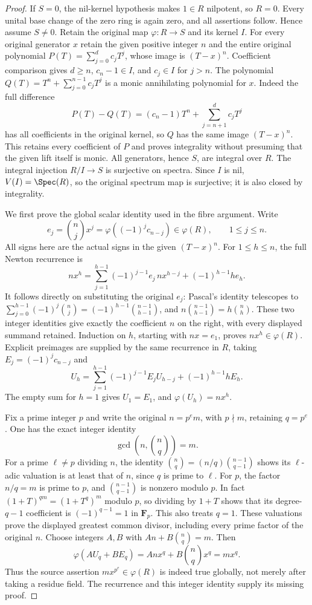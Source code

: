 \begin{proof}
If $S=0$, the nil-kernel hypothesis
makes $1\in R$ nilpotent, so $R=0$.
Every unital base change of the zero
ring is again zero, and all assertions
follow. Hence assume $S\neq0$.
Retain the original map $\varphi:R\to S$
and its kernel $I$. For every original
generator $x$ retain the given positive
integer $n$ and the entire original
polynomial $P(T)=\sum_{j=0}^d c_jT^j$,
whose image is $(T-x)^n$. Coefficient
comparison gives $d\geq n$,
$c_n-1\in I$, and $c_j\in I$ for
$j>n$. The polynomial
$Q(T)=T^n+\sum_{j=0}^{n-1}c_jT^j$
is a monic annihilating polynomial
for $x$. Indeed the full difference
$$
P(T)-Q(T)=(c_n-1)T^n+
\sum_{j=n+1}^d c_jT^j
$$
has all coefficients in the original
kernel, so $Q$ has the same image
$(T-x)^n$. This retains every
coefficient of $P$ and proves
integrality without presuming that
the given lift itself is monic.
All generators, hence $S$, are
integral over $R$. The integral
injection $R/I\to S$ is surjective
on spectra. Since $I$ is nil,
$V(I)=\Spec(R)$, so the original
spectrum map is surjective; it is
also closed by integrality.

We first prove the global scalar
identity used in the fibre argument.
Write
$$
e_j=\binom nj x^j
=\varphi((-1)^j c_{n-j})\in\varphi(R),
\qquad 1\leq j\leq n.
$$
All signs here are the actual signs
in the given $(T-x)^n$. For
$1\leq h\leq n$, the full Newton
recurrence is
$$
n x^h=
\sum_{j=1}^{h-1}(-1)^{j-1}e_j\,n x^{h-j}
+(-1)^{h-1}h e_h.
$$
It follows directly on substituting
the original $e_j$: Pascal's identity
telescopes to
$\sum_{j=0}^{h-1}(-1)^j\binom nj
=(-1)^{h-1}\binom{n-1}{h-1}$,
and $n\binom{n-1}{h-1}=h\binom nh$.
These two integer identities give
exactly the coefficient $n$ on the
right, with every displayed summand
retained. Induction on $h$, starting
with $n x=e_1$, proves $n x^h\in\varphi(R)$.
Explicit preimages are supplied by
the same recurrence in $R$, taking
$E_j=(-1)^j c_{n-j}$ and
$$
U_h=\sum_{j=1}^{h-1}(-1)^{j-1}E_j U_{h-j}
+(-1)^{h-1}h E_h.
$$
The empty sum for $h=1$ gives
$U_1=E_1$, and $\varphi(U_h)=n x^h$.

Fix a prime integer $p$ and write
the original $n=p^e m$, with
$p\nmid m$, retaining $q=p^e$.
One has the exact integer identity
$$
\gcd\left(n,\binom nq\right)=m.
$$
For a prime $\ell\neq p$ dividing
$n$, the identity
$\binom nq=(n/q)\binom{n-1}{q-1}$
shows its $\ell$-adic valuation is
at least that of $n$, since
$q$ is prime to $\ell$.
For $p$, the factor $n/q=m$
is prime to $p$, and
$\binom{n-1}{q-1}$ is nonzero
modulo $p$. In fact
$(1+T)^{qm}=(1+T^q)^m$ modulo
$p$, so dividing by $1+T$ shows
that its degree-$q-1$ coefficient
is $(-1)^{q-1}=1$ in
$\mathbf F_p$. This also treats
$q=1$. These valuations prove
the displayed greatest common
divisor, including every prime
factor of the original $n$.
Choose integers $A,B$ with
$An+B\binom nq=m$. Then
$$
\varphi(AU_q+BE_q)
=A n x^q+B\binom nq x^q=m x^q.
$$
Thus the source assertion
$m x^{p^e}\in\varphi(R)$ is
indeed true globally, not merely
after taking a residue field.
The recurrence and this integer
identity supply its missing proof.


\end{proof}
